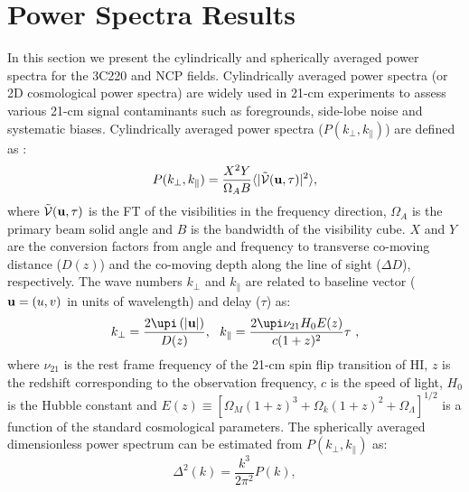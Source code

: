 \documentclass[fleqn,usenatbib]{mnras}
\begin{document}
\section{Power Spectra Results}\label{sec:PSpec-results}
In this section we present the cylindrically and spherically averaged power spectra for the 3C220 and NCP fields. Cylindrically averaged power spectra (or 2D cosmological power spectra) are widely used in 21-cm experiments to assess various 21-cm signal contaminants such as foregrounds, side-lobe noise and systematic biases. Cylindrically averaged power spectra ($P(k_{\perp},k_{\parallel})$) are defined as \citep{parsons2012,thyagarajan2015a}:
\begin{equation}
P(k_{\perp},k_{\parallel}) = \dfrac{X^2 Y}{\Omega_A B} \langle | \tilde{\mathcal{V}}({\it \mathbf{u}},\tau) |^2 \rangle ,
\end{equation}
where $\tilde{\mathcal{V}}({\it \mathbf{u}},\tau)$ is the FT of the visibilities in the frequency direction, $\Omega_A$ is the primary beam solid angle and $B$ is the bandwidth of the visibility cube. $X$ and $Y$ are the conversion factors from angle and frequency to transverse co-moving distance ($D(z)$) and the co-moving depth along the line of sight ($\Delta D$), respectively. The wave numbers $k_{\perp}$ and $k_{\parallel}$ are related to baseline vector (${\it \mathbf{u}} = (u,v)$ in units of wavelength) and delay ($\tau$) as:
\begin{equation}
k_{\perp} = \dfrac{2\upi \left( |{\it \mathbf{u}}| \right)}{D(z)} , \ \ k_{\parallel} = \dfrac{2\upi \nu_{21} H_{\text{0}} E(z)}{c(1+z)^2} \tau \ , 
\end{equation}
where $\nu_{21}$ is the rest frame frequency of the 21-cm spin flip transition of HI, $z$ is the redshift corresponding to the observation frequency, $c$ is the speed of light, $H_0$ is the Hubble constant and $E(z) \equiv \left[ \Omega_M(1+z)^3 + \Omega_k(1+z)^2 + \Omega_{\Lambda}\right]^{1/2} $ is a function of the standard cosmological parameters. The spherically averaged dimensionless power spectrum can be estimated from $P(k_{\perp},k_{\parallel})$ as:
\begin{equation}
\Delta^2(k) = \dfrac{k^3}{2\pi^2} P(k) ,
\end{equation}
\end{document}
